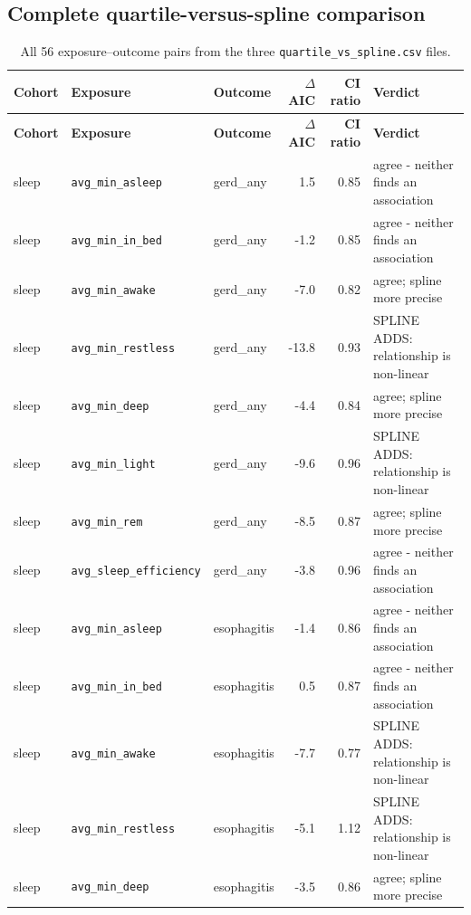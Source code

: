 \documentclass[11pt]{article}
\newcommand{\code}[1]{\texttt{\small #1}}
\begin{document}
\subsection{Complete quartile-versus-spline comparison}
\footnotesize\begin{longtable}{@{}p{2.0cm}p{3.4cm}p{2.4cm}rr p{3.2cm}@{}}
\caption{All 56 exposure--outcome pairs from the three \code{quartile\_vs\_spline.csv} files.}\label{tab:appM-qvs}\\
\toprule \textbf{Cohort} & \textbf{Exposure} & \textbf{Outcome} & \textbf{$\Delta$AIC} & \textbf{CI ratio} & \textbf{Verdict} \\ \midrule \endfirsthead
\toprule \textbf{Cohort} & \textbf{Exposure} & \textbf{Outcome} & \textbf{$\Delta$AIC} & \textbf{CI ratio} & \textbf{Verdict} \\ \midrule \endhead
sleep & \code{avg\_min\_asleep} & gerd\_any & 1.5 & 0.85 & agree - neither finds an association \\
sleep & \code{avg\_min\_in\_bed} & gerd\_any & -1.2 & 0.85 & agree - neither finds an association \\
sleep & \code{avg\_min\_awake} & gerd\_any & -7.0 & 0.82 & agree; spline more precise \\
sleep & \code{avg\_min\_restless} & gerd\_any & -13.8 & 0.93 & SPLINE ADDS: relationship is non-linear \\
sleep & \code{avg\_min\_deep} & gerd\_any & -4.4 & 0.84 & agree; spline more precise \\
sleep & \code{avg\_min\_light} & gerd\_any & -9.6 & 0.96 & SPLINE ADDS: relationship is non-linear \\
sleep & \code{avg\_min\_rem} & gerd\_any & -8.5 & 0.87 & agree; spline more precise \\
sleep & \code{avg\_sleep\_efficiency} & gerd\_any & -3.8 & 0.96 & agree - neither finds an association \\
sleep & \code{avg\_min\_asleep} & esophagitis & -1.4 & 0.86 & agree - neither finds an association \\
sleep & \code{avg\_min\_in\_bed} & esophagitis & 0.5 & 0.87 & agree - neither finds an association \\
sleep & \code{avg\_min\_awake} & esophagitis & -7.7 & 0.77 & SPLINE ADDS: relationship is non-linear \\
sleep & \code{avg\_min\_restless} & esophagitis & -5.1 & 1.12 & SPLINE ADDS: relationship is non-linear \\
sleep & \code{avg\_min\_deep} & esophagitis & -3.5 & 0.86 & agree; spline more precise \\

\end{longtable}
\end{document}
